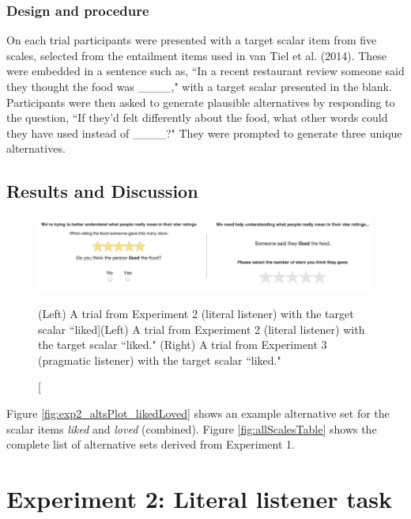 \documentclass[10pt, letterpaper]{article}
\newenvironment{CodeChunk}{}{}
\begin{document}
\subsubsection{Design and procedure}\label{design-and-procedure}

On each trial participants were presented with a target scalar item from
five scales, selected from the entailment items used in {van Tiel} et
al. (2014). These were embedded in a sentence such as, ``In a recent
restaurant review someone said they thought the food was \_\_\_\_," with
a target scalar presented in the blank. Participants were then asked to
generate plausible alternatives by responding to the question, ``If
they'd felt differently about the food, what other words could they have
used instead of \_\_\_\_?" They were prompted to generate three unique
alternatives.

\subsection{Results and Discussion}\label{results-and-discussion}

\begin{CodeChunk}
\begin{figure}[t]

{\centering \includegraphics{figs/stimuli_exp1-1} 

}

\caption[(Left) A trial from Experiment 2 (literal listener) with the target scalar ``liked]{(Left) A trial from Experiment 2 (literal listener) with the target scalar ``liked." (Right) A trial from Experiment 3 (pragmatic listener) with the target scalar ``liked."}\label{fig:stimuli_exp1}
\end{figure}
\end{CodeChunk}

Figure \ref{fig:exp2_altsPlot_likedLoved} shows an example alternative
set for the scalar items \emph{liked} and \emph{loved} (combined).
Figure \ref{fig:allScalesTable} shows the complete list of alternative
sets derived from Experiment 1.

\section{Experiment 2: Literal listener
task}\label{experiment-2-literal-listener-task}
\end{document}
